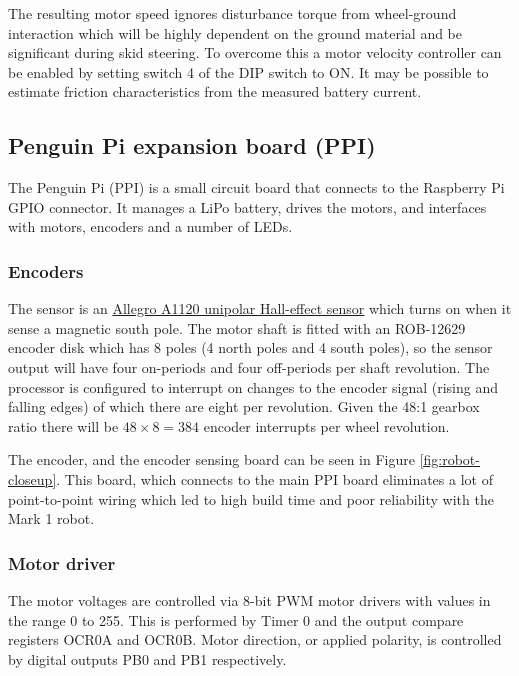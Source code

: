 \documentclass[11pt,fleqn]{article}
\begin{document}
The resulting motor speed ignores disturbance torque from wheel-ground interaction which will be highly dependent on the ground material and  be significant during skid steering.  To overcome this a motor velocity controller can be enabled by setting switch 4 of the DIP switch to ON.
It may be possible to estimate  friction characteristics from the measured battery current.

\subsection{Penguin Pi expansion board (PPI)}
The Penguin Pi (PPI) is a small circuit board that connects to the Raspberry Pi GPIO connector.  
It manages a LiPo battery, drives the motors, and interfaces with motors, encoders and a number of LEDs.

\subsubsection{Encoders}

The sensor is an \href{https://www.google.com/url?sa=t&rct=j&q=&esrc=s&source=web&cd=2&ved=2ahUKEwie-sPD3pzdAhUPVt8KHQ58Ad0QFjABegQICRAC&url=https%3A%2F%2Fwww.allegromicro.com%2F~%2Fmedia%2FFiles%2FDatasheets%2FA112x-Datasheet.ashx&usg=AOvVaw0f7rcuUrchXBUwaIueUS9B}{Allegro A1120 unipolar Hall-effect sensor} which turns on when it sense a magnetic south pole.
The motor shaft is fitted with an ROB-12629 encoder disk which has 8  poles (4 north poles and 4 south poles), so the sensor output will have four on-periods and four off-periods per shaft revolution.
The processor is configured to interrupt on changes to the encoder signal (rising and falling edges) of which there are
eight per revolution.  Given the 48:1 gearbox ratio there will be $48 \times 8 = 384$ encoder interrupts per wheel revolution.

The encoder, and the encoder sensing board can be
seen in Figure \ref{fig:robot-closeup}.  This board, which connects to the main PPI board eliminates a lot of point-to-point wiring which 
 led to high build time and poor reliability with the Mark 1 robot.




\subsubsection{Motor driver}\label{sec:motor-control}
The motor voltages are controlled via 8-bit PWM motor drivers with values in the range 0 to 255.
This is performed by Timer 0 and the output compare registers OCR0A and OCR0B.
Motor direction, or applied polarity, is controlled by digital outputs PB0 and PB1 respectively.
\end{document}
